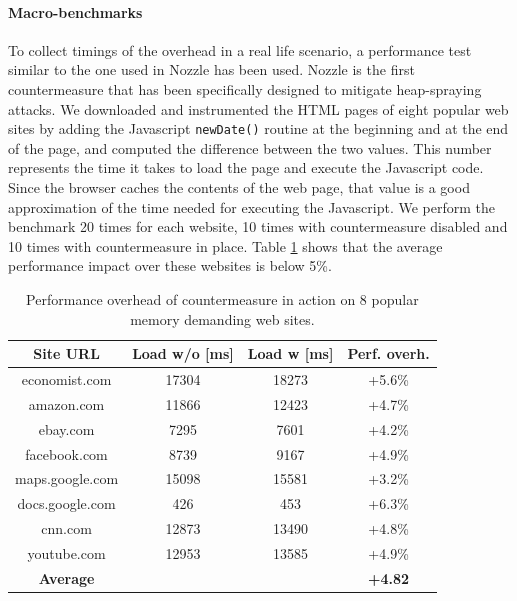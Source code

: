 \paragraph{Macro-benchmarks}
To collect timings of the overhead in a real life scenario, a performance test similar to the one used in Nozzle \cite{nozzle08tr} has been used. Nozzle is the first countermeasure that has been specifically designed to mitigate heap-spraying attacks.
We downloaded and instrumented the HTML pages of eight popular web sites by adding the Javascript \texttt{newDate()} routine at the beginning and at the end of the page, and computed the difference between the two values. This number represents the time it takes to load the page and execute the Javascript code. Since the browser caches the contents of the web page, that value is a good approximation of the time needed for executing the Javascript.
We perform the benchmark 20 times for each website, 10 times with countermeasure disabled and 10 times with countermeasure in place. Table \ref{perfpopular} shows that the average performance impact over these websites is below 5\%.

\begin{table}[htdp]
\begin{center}
\begin{tabular}{|c|c|c|c|} 
\hline
\bf{Site URL} & \bf{Load w/o [ms]} & \bf{Load w [ms]} & \bf{Perf. overh.} \\
\hline
economist.com 	& 	17304 	& 	18273	&  +5.6\% \\ 
amazon.com    	&      11866  	&  	12423 	&  +4.7\% \\
ebay.com 		&      7295  	&  	7601  	&+4.2\% \\
facebook.com 	&      8739  	&  	9167 	& +4.9\%\\ 
maps.google.com &  15098	&	15581       & +3.2\%\\
docs.google.com	& 426	&	453		& +6.3\%\\
cnn.com     	&      12873 	&  	13490 	&+4.8\%\\ 
youtube.com 	&      12953 	&  	13585    	& +4.9\%\\
\hline
\bf{Average}  &   &   & \bf{+4.82}\\ 
\hline
\end{tabular}
\end{center}
\vspace{-0.3cm}
\caption{{ Performance overhead of countermeasure in action on 8 popular memory demanding web sites.}}
\vspace{0.3cm}
\label{perfpopular}
\end{table} 

